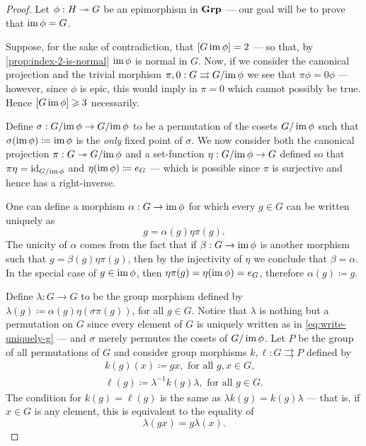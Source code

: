 \begin{proof}
Let \(\phi: H \twoheadrightarrow G\) be an epimorphism in \({\textbf{Grp}}\) --- our goal will be to
prove that \(\operatorname{im} \phi = G\).

Suppose, for the sake of contradiction, that \([G \relax \operatorname{im} \phi] = 2\) --- so
that, by \cref{prop:index-2-is-normal} \(\operatorname{im} \phi\) is normal in \(G\). Now, if
we consider the canonical projection and the trivial morphism
\(\pi, 0: G \rightrightarrows G/{\operatorname{im} \phi}\) we see that \(\pi \phi = 0 \phi\)
--- however, since \(\phi\) is epic, this would imply in \(\pi = 0\) which
cannot possibly be true. Hence \([G \relax \operatorname{im} \phi] \geqslant 3\) necessarily.

Define \(\sigma: G/{\operatorname{im} \phi} \to G/{\operatorname{im} \phi}\) to be a permutation of the
cosets \(G/\operatorname{im} \phi\) such that \(\sigma(\operatorname{im} \phi) \coloneq \operatorname{im} \phi\) is the
\emph{only} fixed point of \(\sigma\). We now consider both the canonical
projection \(\pi: G \twoheadrightarrow G/{\operatorname{im} \phi}\) and a set-function
\(\eta: G/{\operatorname{im} \phi} \to G\) defined so that \(\pi \eta = \operatorname{id}_{G/{\operatorname{im} \phi}}\)
and \(\eta(\operatorname{im} \phi) \coloneq e_G\) --- which is possible since \(\pi\) is
surjective and hence has a right-inverse.

One can define a morphism \(\alpha: G \to \operatorname{im} \phi\) for which every
\(g \in G\) can be written uniquely as
\begin{equation}\label{eq:write-uniquely-g}
  g = \alpha(g) \eta \pi(g).
\end{equation}
The unicity of \(\alpha\) comes from the fact that if \(\beta: G \to \operatorname{im} \phi\)
is another morphism such that \(g = \beta(g) \eta \pi(g)\), then by the
injectivity of \(\eta\) we conclude that \(\beta = \alpha\). In the special case
of \(g \in \operatorname{im} \phi\), then \(\eta\pi(g) = \eta(\operatorname{im} \phi) = e_G\), therefore
\(\alpha(g) \coloneq g\).

Define \(\lambda: G \to G\) to be the group morphism defined by
\(\lambda(g) \coloneq \alpha(g) \eta (\sigma \pi(g))\), for all \(g \in
G\). Notice that \(\lambda\) is nothing but a permutation on \(G\) since every
element of \(G\) is uniquely written as in \cref{eq:write-uniquely-g} --- and
\(\sigma\) merely permutes the cosets of \(G/\operatorname{im} \phi\). Let \(P\) be the group
of all permutations of \(G\) and consider group morphisms
\(k, \ell: G \rightrightarrows P\) defined by
\begin{gather}
  \label{gath:k-definition-gx}
  k(g)(x)  \coloneq  g x, \text{ for all } g, x \in G, \\
  \label{gath:ell-definition-g}
  \ell(g) \coloneq \lambda^{-1} k(g) \lambda, \text{ for all } g \in G.
\end{gather}
The condition for \(k(g) = \ell(g)\) is the same as
\(\lambda k(g) = k(g) \lambda\) --- that is, if \(x \in G\) is any element,
this is equivalent to the equality of
\begin{equation}\label{eq:k=l-any-x-in-G}
  \lambda(g x) = g \lambda(x).
\end{equation}


\end{proof}

